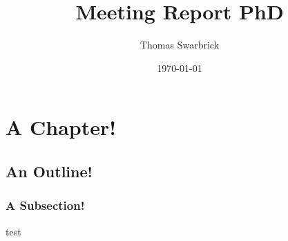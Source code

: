 \documentclass{report}
\title{Meeting Report PhD}
\author{Thomas Swarbrick}
\date{\today}
\begin{document}
\maketitle
\abstract
\tableofcontents
\newpage
\chapter{A Chapter!}
\section{An Outline!}

\subsection{A Subsection!}
\begin{example}
  test
\end{example}
\end{document}

